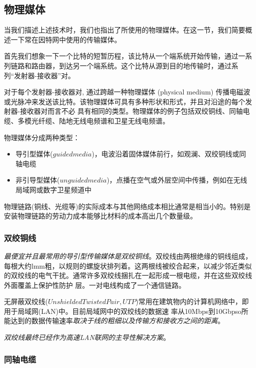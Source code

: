 \subsection{物理媒体}

    当我们描述上述技术时，我们也指出了所使用的物理媒体。在这一节，我们简要概述一下常在因特网中使用的传输媒体。

    首先我们想象一下一个比特的短暂历程，该比特从一个端系统开始传输，通过一系列链路和路由器，到达另一个端系统。这个比特从源到目的地传输时，通过系列“发射器-接收器”对。

    对于每个发射器-接收器对, 通过跨越一种物理媒体 (physical medium) 传播电磁波或光脉冲来发送该比特。该物理媒体可具有多种形状和形式，并且对沿途的每个发射器-接收器对而言不必 具有相同的类型。物理媒体的例子包括双绞铜线、同轴电缆、多模光纤缆、陆地无线电频谱和卫星无线电频谱。

    物理媒体分成两种类型：

\begin{itemize}
    \item 导引型媒体($guided media$)，电波沿着固体媒体前行，如观澜、双绞铜线或同轴电缆
    \item 非引导型媒体($unguided media$)，点播在空气或外层空间中传播，例如在无线局域网或数字卫星频道中
\end{itemize}

    物理链路(铜线、光缆等)的实际成本与其他网络成本相比通常是相当小的。特别是安装物理链路的劳动力成本能够比材料的成本高出几个数量级。

\subsubsection{双绞铜线}

    \emph{最便宜并且最常用的导引型传输媒体是双绞铜线}。双绞线由两根绝缘的铜线组成，每根大约lmm粗，以规则的螺旋状排列着。这两根线被绞合起来，以减少邻近类似的双绞线的电气干扰。通常许多双绞线捆扎在一起形成一根电缆，并在这些双绞线外面覆盖上保护性防护 层。一对电线构成了一个通信链路。

    无屏蔽双绞线($Unshielded Twisted Pair, UTP$)常用在建筑物内的计算机网络中，即用于局域网(LAN)中。目前局域网中的双绞线的数据速 率从10Mbps到10Gbpso所能达到的数据传输速率\emph{取决于线的粗细以及传输方和接收方之间的距离}。

    \emph{双绞线最终已经作为高速LAN联网的主导性解决方案}。

\subsubsection{同轴电缆}

